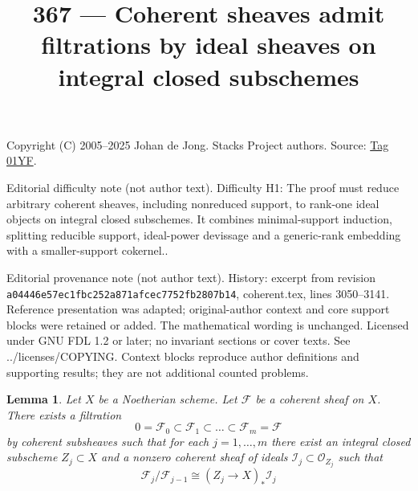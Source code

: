 \documentclass{amsart}
\theoremstyle{plain}
\newtheorem{lemma}[subsection]{Lemma}
\theoremstyle{definition}
\theoremstyle{remark}
\numberwithin{equation}{subsection}
\begin{document}
\title[Stacks Project, Tag 01YF]{367 --- Coherent sheaves admit filtrations by ideal sheaves on integral closed subschemes}
\maketitle
\noindent Copyright (C) 2005--2025 Johan de Jong. Stacks Project authors. Source: \href{https://stacks.math.columbia.edu/tag/01YF}{Tag 01YF}.

\noindent Editorial difficulty note (not author text). Difficulty H1: The proof must reduce arbitrary coherent sheaves, including nonreduced support, to rank-one ideal objects on integral closed subschemes. It combines minimal-support induction, splitting reducible support, ideal-power devissage and a generic-rank embedding with a smaller-support cokernel..

\noindent Editorial provenance note (not author text). History: excerpt from revision \texttt{a0444\allowbreak 6e57e\allowbreak c1fbc\allowbreak 252a8\allowbreak 71afc\allowbreak ec775\allowbreak 2fb28\allowbreak 07b14}, coherent.tex, lines 3050--3141. Reference presentation was adapted; original-author context and core support blocks were retained or added. The mathematical wording is unchanged. Licensed under GNU FDL 1.2 or later; no invariant sections or cover texts. See ../licenses/COPYING. Context blocks reproduce author definitions and supporting results; they are not additional counted problems.

\begin{lemma}
\label{lemma-coherent-filter}
Let $X$ be a Noetherian scheme.
Let $\mathcal{F}$ be a coherent sheaf on $X$.
There exists a filtration
$$
0 = \mathcal{F}_0 \subset \mathcal{F}_1 \subset
\ldots \subset \mathcal{F}_m = \mathcal{F}
$$
by coherent subsheaves such that for each $j = 1, \ldots, m$
there exist an integral closed subscheme $Z_j \subset X$ and
a nonzero coherent sheaf of ideals $\mathcal{I}_j \subset \mathcal{O}_{Z_j}$
such that
$$
\mathcal{F}_j/\mathcal{F}_{j - 1}
\cong (Z_j \to X)_* \mathcal{I}_j
$$
\end{lemma}
\end{document}
